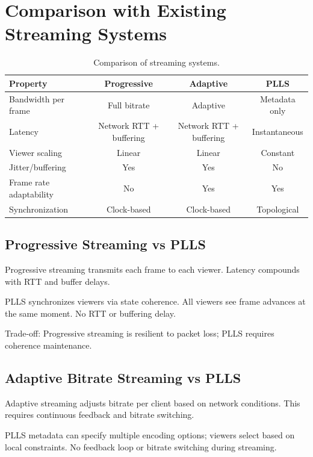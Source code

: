 \documentclass[twocolumn,10pt,a4paper]{article}
\theoremstyle{plain}
\theoremstyle{definition}
\begin{document}
\section{Comparison with Existing Streaming Systems}
\label{sec:comparison}

\begin{table}[h]
\centering
\caption{Comparison of streaming systems.}
\begin{tabular}{lccc}
\toprule
\textbf{Property} & \textbf{Progressive} & \textbf{Adaptive} & \textbf{PLLS} \\
\midrule
Bandwidth per frame & Full bitrate & Adaptive & Metadata only \\
Latency & Network RTT + buffering & Network RTT + buffering & Instantaneous \\
Viewer scaling & Linear & Linear & Constant \\
Jitter/buffering & Yes & Yes & No \\
Frame rate adaptability & No & Yes & Yes \\
Synchronization & Clock-based & Clock-based & Topological \\
\bottomrule
\end{tabular}
\end{table}

\subsection{Progressive Streaming vs PLLS}

Progressive streaming transmits each frame to each viewer. Latency compounds with RTT and buffer delays.

PLLS synchronizes viewers via state coherence. All viewers see frame advances at the same moment. No RTT or buffering delay.

Trade-off: Progressive streaming is resilient to packet loss; PLLS requires coherence maintenance.

\subsection{Adaptive Bitrate Streaming vs PLLS}

Adaptive streaming adjusts bitrate per client based on network conditions. This requires continuous feedback and bitrate switching.

PLLS metadata can specify multiple encoding options; viewers select based on local constraints. No feedback loop or bitrate switching during streaming.
\end{document}
